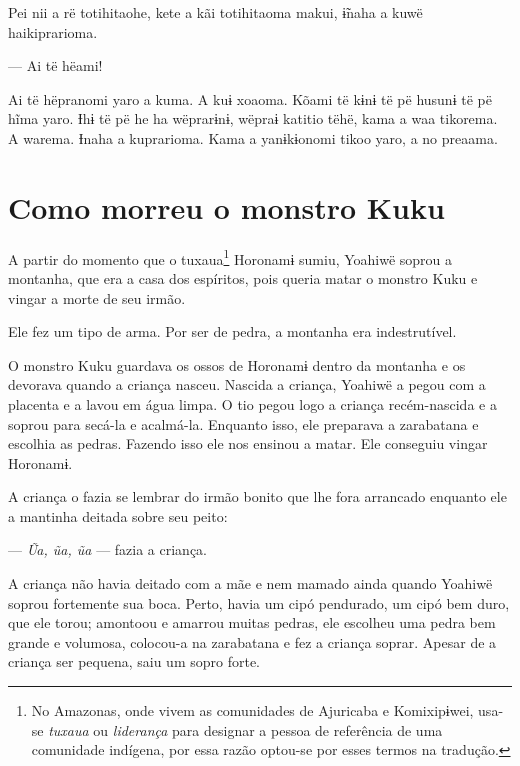 Pei nii a rë totihitaohe, kete a kãi totihitaoma makui, ɨ̃naha a kuwë
haikiprarioma. 

--- Ai të hëami! 

Ai të hëpranomi yaro a kuma. A kuɨ xoaoma. Kõami të kɨnɨ të pë husunɨ të
pë hĩma yaro. Ɨhɨ të pë he ha wëprarɨnɨ, wëpraɨ katitio tëhë, kama a waa
tikorema. A warema. Ɨnaha a kuprarioma. Kama a yanɨkɨonomi tikoo yaro, a
no preaama.

\chapter{Como morreu o monstro Kuku}

  

A partir do momento que o tuxaua\footnote{No Amazonas, onde vivem as comunidades de Ajuricaba e Komixipɨwei,
usa-se \textit{tuxaua} ou \textit{liderança} para designar a pessoa de referência
de uma comunidade indígena, por essa razão optou-se por esses termos na
tradução.} Horonamɨ sumiu, Yoahiwë soprou a
montanha, que era a casa dos espíritos, pois queria matar o monstro Kuku
e vingar a morte de seu irmão. 

Ele fez um tipo de arma. Por ser de pedra, a montanha era
 indestrutível.

O monstro Kuku guardava os ossos de Horonamɨ dentro da montanha e os
 devorava quando a criança nasceu. Nascida a criança, Yoahiwë a pegou com
 a placenta e a lavou em água limpa. O tio pegou logo a criança
 recém-nascida e a soprou para secá-la e acalmá-la. Enquanto isso, ele
 preparava a zarabatana e escolhia as pedras. Fazendo isso ele nos
 ensinou a matar. Ele conseguiu vingar Horonamɨ.

A criança o fazia se lembrar do irmão bonito que lhe fora arrancado
enquanto ele a mantinha deitada sobre seu peito:

--- \textit{Ũa, ũa, ũa} --- fazia a criança. 

A criança não havia deitado com a mãe e nem mamado ainda quando Yoahiwë
soprou fortemente sua boca. Perto, havia um cipó pendurado, um cipó bem
duro, que ele torou; amontoou e amarrou muitas pedras, ele escolheu uma
pedra bem grande e volumosa, colocou-a na zarabatana e fez a criança
soprar. Apesar de a criança ser pequena, saiu um sopro forte. 

